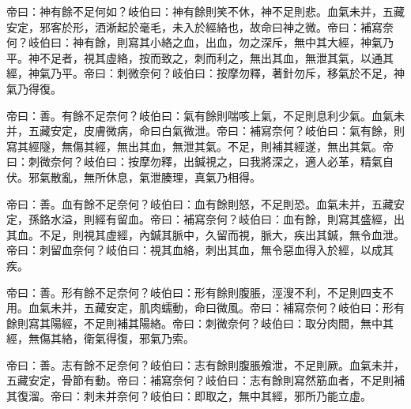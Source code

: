 \documentclass[draft,12pt]{ctexbook}
\begin{document}
\begin{yuanwen}
帝曰：神有餘不足何如？岐伯曰：神有餘則笑不休，神不足則悲。血氣未并，五藏安定，邪客於形，洒淅起於毫毛，未入於經絡也，故命曰神之微。帝曰：補寫奈何？岐伯曰：神有餘，則寫其小絡之血，出血，勿之深斥，無中其大經，神氣乃平。神不足者，視其虛絡，按而致之，刺而利之，無出其血，無泄其氣，以通其經，神氣乃平。帝曰：刺微奈何？岐伯曰：按摩勿釋，著針勿斥，移氣於不足，神氣乃得復。

帝曰：善。有餘不足奈何？岐伯曰：氣有餘則喘咳上氣，不足則息利少氣。血氣未并，五藏安定，皮膚微病，命曰白氣微泄。帝曰：補寫奈何？岐伯曰：氣有餘，則寫其經隧，無傷其經，無出其血，無泄其氣。不足，則補其經遂，無出其氣。帝曰：刺微奈何？岐伯曰：按摩勿釋，出鍼視之，曰我將深之，適人必革，精氣自伏。邪氣散亂，無所休息，氣泄腠理，真氣乃相得。

帝曰：善。血有餘不足奈何？岐伯曰：血有餘則怒，不足則恐。血氣未并，五藏安定，孫鉻水溢，則經有留血。帝曰：補寫奈何？岐伯曰：血有餘，則寫其盛經，出其血。不足，則視其虛經，內鍼其脈中，久留而視，脈大，疾出其鍼，無令血泄。帝曰：刺留血奈何？岐伯曰：視其血絡，刺出其血，無令惡血得入於經，以成其疾。

帝曰：善。形有餘不足奈何？岐伯曰：形有餘則腹脹，涇溲不利，不足則四支不用。血氣未并，五藏安定，肌肉蠕動，命曰微風。帝曰：補寫奈何？岐伯曰：形有餘則寫其陽經，不足則補其陽絡。帝曰：刺微奈何？岐伯曰：取分肉間，無中其經，無傷其絡，衛氣得復，邪氣乃索。

帝曰：善。志有餘不足奈何？岐伯曰：志有餘則腹脹飧泄，不足則厥。血氣未并，五藏安定，骨節有動。帝曰：補寫奈何？岐伯曰：志有餘則寫然筋血者，不足則補其復溜。帝曰：刺未并奈何？岐伯曰：即取之，無中其經，邪所乃能立虛。
\end{yuanwen}

\end{document}
